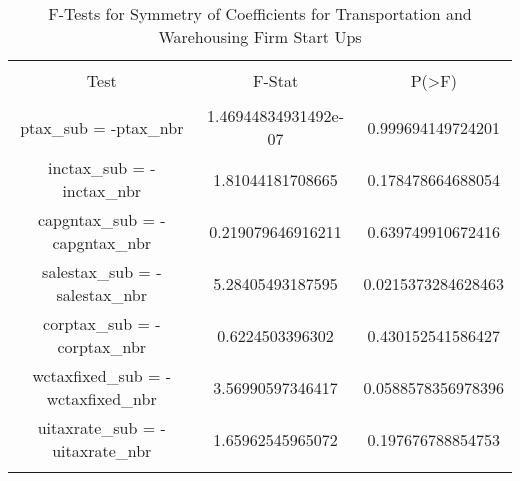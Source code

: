 
\begin{table}[!htbp] \centering 
  \caption{F-Tests for Symmetry of Coefficients for Transportation and Warehousing Firm Start Ups} 
  \label{} 
\begin{tabular}{@{\extracolsep{5pt}} ccc} 
\\[-1.8ex]\hline 
\hline \\[-1.8ex] 
Test & F-Stat & P(\textgreater F) \\ 
\hline \\[-1.8ex] 
ptax\_sub = -ptax\_nbr & 1.46944834931492e-07 & 0.999694149724201 \\ 
inctax\_sub = -inctax\_nbr & 1.81044181708665 & 0.178478664688054 \\ 
capgntax\_sub = -capgntax\_nbr & 0.219079646916211 & 0.639749910672416 \\ 
salestax\_sub = -salestax\_nbr & 5.28405493187595 & 0.0215373284628463 \\ 
corptax\_sub = -corptax\_nbr & 0.6224503396302 & 0.430152541586427 \\ 
wctaxfixed\_sub = -wctaxfixed\_nbr & 3.56990597346417 & 0.0588578356978396 \\ 
uitaxrate\_sub = -uitaxrate\_nbr & 1.65962545965072 & 0.197676788854753 \\ 
\hline \\[-1.8ex] 
\end{tabular} 
\end{table} 
